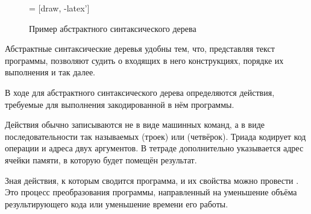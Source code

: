 \begin{figure}
  \begin{centering}
     = [draw, -latex']
    
    \par
  \end{centering}

  \caption{Пример абстрактного синтаксического дерева\label{fig:ast}}
\end{figure}

Абстрактные синтаксические деревья удобны тем, что, представляя текст
программы, позволяют судить о входящих в него конструкциях, порядке их
выполнения и так далее.


В ходе  для
абстрактного синтаксического дерева определяются действия, требуемые
для выполнения закодированной в нём программы.

Действия обычно записываются не в виде машинных команд, а в виде
последовательности так называемых  (троек) или
 (четвёрок). Триада кодирует код операции и
адреса двух аргументов. В тетраде дополнительно указывается адрес
ячейки памяти, в которую будет помещён результат.


Зная действия, к которым сводится программа, и их свойства можно
провести . Это процесс преобразования
программы, направленный на уменьшение объёма результирующего кода или
уменьшение времени его работы.

